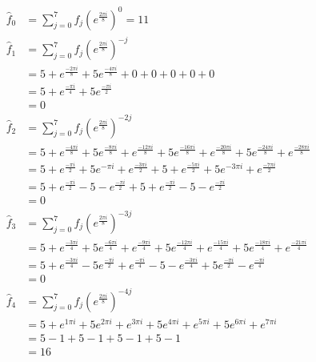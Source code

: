 \documentclass{report}
\begin{document}
\begin{solution}
\begin{enumerate}[label=(\alph*)]
		      \begin{align*}
			      \hat{f}_0 & = \sum_{j=0}^{7} f_{j} \left(e^{\frac{2\pi i}{8}}\right)^{0} = 11 \\
			      \hat{f}_1 & = \sum_{j=0}^{7} f_{j} \left(e^{\frac{2\pi i}{8}}\right)^{-j} \\
			                & =   5 + e^{\frac{-2\pi i}{8}} + 5e^{\frac{-4\pi i }{8}} + 0+0+ 0+ 0+ 0 \\
			                & =  5 + e^{\frac{-\pi i}{4}} + 5 e^{\frac{-\pi i }{2}} \\
			                & = 0 \\
			      \hat{f}_2 & = \sum_{j=0}^{7} f_{j} \left(e^{\frac{2\pi i}{8}}\right)^{-2j} \\
			                & =   5 + e^{\frac{-4\pi i}{8}} + 5e^{\frac{-8\pi i }{8}} + e^{\frac{-12\pi i }{8}} +5 e^{\frac{-16\pi i }{8}}
			      + e^{\frac{-20\pi i}{8}} + 5e^{\frac{-24\pi i}{8}} + e^{\frac{-28\pi i}{8}} \\
			                & =  5 + e^{\frac{-\pi i}{2}} + 5 e^{-\pi i } + e^{\frac{-3\pi i }{2}} +5
			      + e^{\frac{-5\pi i}{2}} + 5e^{-3\pi i} + e^{\frac{-7\pi i}{2}} \\
			                & =  5 + e^{\frac{-\pi i}{2}} - 5  - e^{\frac{-\pi i }{2}} +5
			      + e^{\frac{-\pi i}{2}} - 5 - e^{\frac{-\pi i}{2}} \\
			                & = 0 \\
			      \hat{f}_3 & = \sum_{j=0}^{7} f_{j} \left(e^{\frac{2\pi i}{8}}\right)^{-3j} \\
			                & =   5 + e^{\frac{-3\pi i}{4}} + 5e^{\frac{-6\pi i }{4}} + e^{\frac{-9\pi i }{4}} +5 e^{\frac{-12\pi i }{4}}
			      + e^{\frac{-15\pi i}{4}} + 5e^{\frac{-18\pi i}{4}} + e^{\frac{-21\pi i}{4}} \\
			                & =  5 + e^{\frac{-3\pi i}{4}} - 5e^{\frac{-\pi i }{2}} + e^{\frac{-\pi i }{4}} -5
			      - e^{\frac{-3\pi i}{4}} + 5e^{\frac{-\pi i}{2}} - e^{\frac{-\pi i}{4}} \\
			                & =  0 \\
			      \hat{f}_4 & = \sum_{j=0}^{7} f_{j} \left(e^{\frac{2\pi i}{8}}\right)^{-4j} \\
			                & =   5 + e^{1\pi i} + 5e^{2\pi i} + e^{3\pi i} +5 e^{4\pi i}
			      + e^{5\pi i} + 5e^{6\pi i} + e^{7\pi i} \\
			                & =  5 - 1 + 5 - 1 +5 -1  + 5 -1 \\
			                & =  16 \\

\end{align*}
\end{enumerate}
\end{solution}
\end{document}
